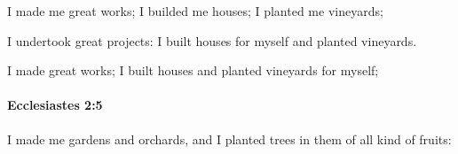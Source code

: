 			\begin{versebox}
					\item[BHS] 
					\item[LXX] 
					\item[ASV] I made me great works; I builded me houses; I planted me vineyards;
					\item[NIV] I undertook great projects: I built houses for myself and planted vineyards.
					\item[NRSV] I made great works; I built houses and planted vineyards for myself;
			\end{versebox}

		\paragraph{Ecclesiastes 2:5} %
			\label{ECCLESIASTES-2-5}

			I made me gardens and orchards, and I planted trees in them of all kind of fruits:


